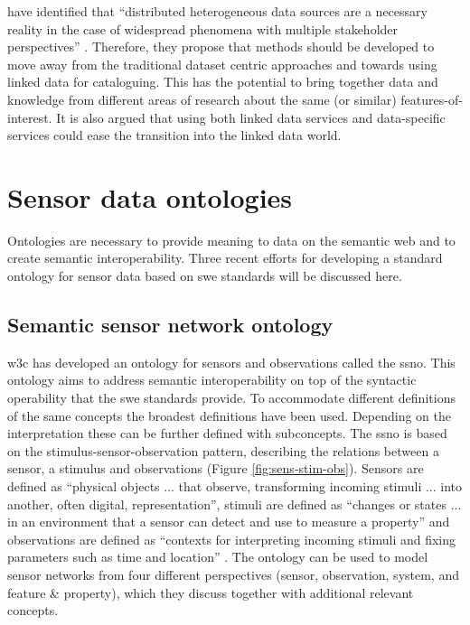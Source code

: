 \cite{SSW:Atkinson} have identified that \enquote{distributed heterogeneous data sources are a necessary reality in the case of widespread phenomena with multiple stakeholder perspectives} \cite[p.129]{SSW:Atkinson}. Therefore, they propose that methods should be developed to move away from the traditional dataset centric approaches and towards using linked data for cataloguing. This has the potential to bring together data and knowledge from different areas of research about the same (or similar) features-of-interest. It is also argued that using both linked data services and data-specific services could ease the transition into the linked data world.  

\section{Sensor data ontologies}

Ontologies are necessary to provide meaning to data on the semantic web and to create semantic interoperability. Three recent efforts for developing a standard ontology for sensor data based on \ac{swe} standards will be discussed here.

\subsection{Semantic sensor network ontology} 
\ac{w3c} has developed an ontology for sensors and observations called the \ac{ssno}. This ontology aims to address semantic interoperability on top of the syntactic operability that the \ac{swe} standards provide. To accommodate different definitions of the same concepts the broadest definitions have been used. Depending on the interpretation these can be further defined with subconcepts. The \ac{ssno} is based on the stimulus-sensor-observation pattern, describing the relations between a sensor, a stimulus and observations (Figure \ref{fig:sens-stim-obs}). Sensors are defined as \enquote{physical objects ... that observe, transforming incoming stimuli ... into another, often digital, representation}, stimuli are defined as \enquote{changes or states ... in an environment that a sensor can detect and use to measure a property} and observations are defined as \enquote{contexts for interpreting incoming stimuli and fixing parameters such as time and location} \cite[p. 28]{SSW:SSN_incubatorGroup}. The ontology can be used to model sensor networks from four different perspectives (sensor, observation, system, and feature \& property), which they discuss together with additional relevant concepts.

